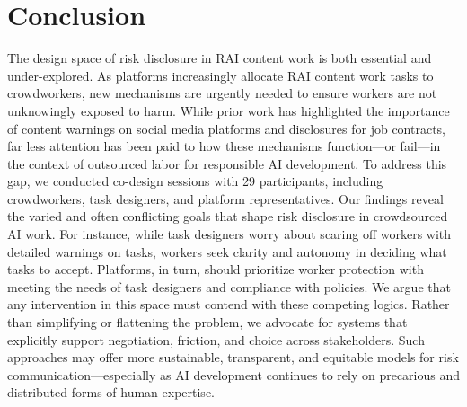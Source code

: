 \section{Conclusion}
The design space of risk disclosure in RAI content work is both essential and under-explored. As platforms increasingly allocate RAI content work tasks to crowdworkers, new mechanisms are urgently needed to ensure workers are not unknowingly exposed to harm. While prior work has highlighted the importance of content warnings on social media platforms and disclosures for job contracts, far less attention has been paid to how these mechanisms function—or fail—in the context of outsourced labor for responsible AI development. To address this gap, we conducted co-design sessions with 29 participants, including crowdworkers, task designers, and platform representatives. Our findings reveal the varied and often conflicting goals that shape risk disclosure in crowdsourced AI work. For instance, while task designers worry about scaring off workers with detailed warnings on tasks, workers seek clarity and autonomy in deciding what tasks to accept. Platforms, in turn, should prioritize worker protection with meeting the needs of task designers and compliance with policies. We argue that any intervention in this space must contend with these competing logics. Rather than simplifying or flattening the problem, we advocate for systems that explicitly support negotiation, friction, and choice across stakeholders. Such approaches may offer more sustainable, transparent, and equitable models for risk communication---especially as AI development continues to rely on precarious and distributed forms of human expertise.